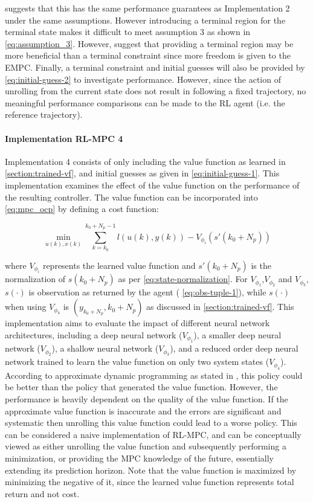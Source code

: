 \cite{amritEconomicOptimizationUsing2011} suggests that this has the same performance guarantees as Implementation 2 under the same assumptions. However introducing a terminal region for the terminal state makes it difficult to meet assumption 3 as shown in \autoref{eq:assumption_3}. However, \cite{amritEconomicOptimizationUsing2011} suggest that providing a terminal region may be more beneficial than a terminal constraint since more freedom is given to the EMPC. Finally, a terminal constraint and initial guesses will also be provided by \autoref{eq:initial-guess-2} to investigate performance. However, since the action of unrolling from the current state does not result in following a fixed trajectory, no meaningful performance comparisons can be made to the RL agent (i.e. the reference trajectory).

\paragraph{Implementation RL-MPC 4}
Implementation 4 consists of only including the value function as learned in \autoref{section:trained-vf}, and initial guesses as given in \autoref{eq:initial-guess-1}. This implementation examines the effect of the value function on the performance of the resulting controller. The value function can be incorporated into \autoref{eq:mpc_ocp} by defining a cost function:

\begin{equation}\label{eq:cost-function}
		\min_{u(k),x(k)}  \sum_{k = k_0}^{k_0 + N_p - 1}{l(u(k), y(k))} - V_{\phi_i}(s'(k_0 + N_p))
\end{equation}

where $V_{\phi_i}$ represents the learned value function and $s'(k_0+N_p)$ is the normalization of $s(k_0+N_p)$ as per \autoref{eq:state-normalization}. For $V_{\phi_1}$,$V_{\phi_2}$ and $V_{\phi_3}$, $s(\cdot)$ is observation as returned by the agent ( \autoref{eq:obs-tuple-1}), while $s(\cdot)$ when using $V_{\phi_4}$ is $(y_{k_0+N_p},k_0+N_p)$ as discussed in \autoref{section:trained-vf}. This implementation aims to evaluate the impact of different neural network architectures, including a deep neural network ($V_{\phi_1}$), a smaller deep neural network ($V_{\phi_2}$), a shallow neural network ($V_{\phi_3}$), and a reduced order deep neural network trained to learn the value function on only two system states ($V_{\phi_4}$). According to approximate dynamic programming as stated in \cite{bertsekasLessonsAlphaZeroOptimal}, this policy could be better than the policy that generated the value function. However, the performance is heavily dependent on the quality of the value function. If the approximate value function is inaccurate and the errors are significant and systematic then unrolling this value function could lead to a worse policy.  This can be considered a naive implementation of RL-MPC, and can be conceptually viewed as either unrolling the value function and subsequently performing a minimization, or providing the MPC knowledge of the future, essentially extending its prediction horizon. Note that the value function is maximized by minimizing the negative of it, since the learned value function represents total return and not cost.

